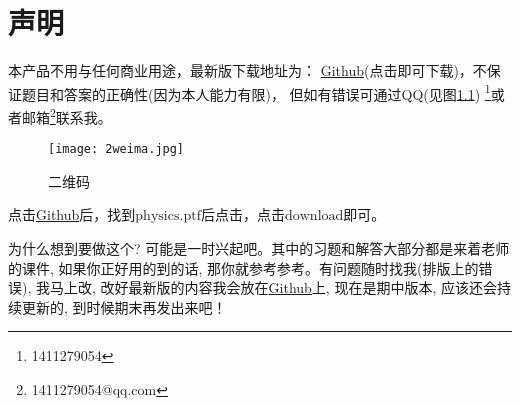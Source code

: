 \chapter{声明}
本产品不用与任何商业用途，最新版下载地址为：
\href{https://github.com/1411279054/Letax-learning-Note/tree/master/%E5%A4%A7%E5%AD%A6%E7%89%A9%E7%90%86%E5%A4%8D%E4%B9%A0%E6%8C%87%E5%8D%97}{Github}(点击即可下载)，不保证题目和答案的正确性(因为本人能力有限)，
但如有错误可通过QQ(见图\ref{fig:1}) \footnote{1411279054}或者邮箱\footnote{1411279054@qq.com}联系我。
\begin{figure}[htbp]
	\centering
	\texttt{[image: 2weima.jpg]}
	\caption{二维码}\label{fig:1}
\end{figure}

点击\href{https://github.com/1411279054/Letax-learning-Note/tree/master/%E5%A4%A7%E5%AD%A6%E7%89%A9%E7%90%86%E5%A4%8D%E4%B9%A0%E6%8C%87%E5%8D%97}{Github}后，找到$\mathrm{physics.ptf}$后点击，点击$\mathrm{download}$即可。
\\
\begin{remarkname}
	为什么想到要做这个? 可能是一时兴起吧。其中的习题和解答大部分都是来着老师的课件, 如果你正好用的到的话, 那你就参考参考。有问题随时找我(排版上的错误), 我马上改, 改好最新版的内容我会放在\href{https://github.com/1411279054/Letax-learning-Note/tree/master/%E5%A4%A7%E5%AD%A6%E7%89%A9%E7%90%86%E5%A4%8D%E4%B9%A0%E6%8C%87%E5%8D%97}{Github}上, 现在是期中版本, 应该还会持续更新的, 到时候期末再发出来吧！
\end{remarkname}
